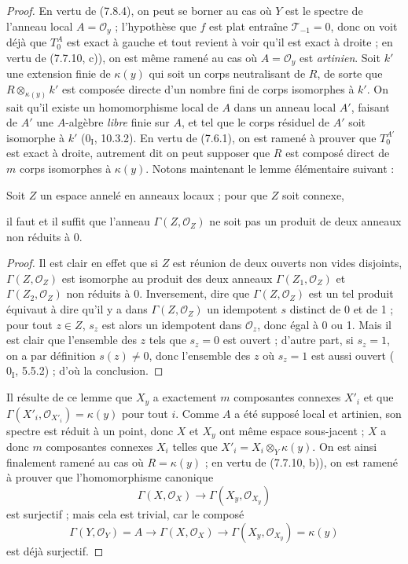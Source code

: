 \begin{proof}
En vertu de (7.8.4), on peut se borner au cas où $Y$ est le spectre de l'anneau
local $A=\mathscr O_y$ ; l'hypothèse que $f$ est plat entraîne
$\mathscr T_{-1}=0$, donc on voit déjà que $T_0^A$ est exact à gauche et tout
revient à voir qu'il est exact à droite ; en vertu de (7.7.10, c)), on est même
ramené au cas où $A=\mathscr O_y$ est \emph{artinien}. Soit $k'$ une extension
finie de $\kappa(y)$ qui soit un corps neutralisant de $R$, de sorte que
$R\otimes_{\kappa(y)}k'$ est composée directe d'un nombre fini de corps
isomorphes à $k'$. On sait qu'il existe un homomorphisme local de $A$ dans un
anneau local $A'$, faisant de $A'$ une $A$-algèbre \emph{libre} finie sur $A$,
et tel que le corps résiduel de $A'$ soit isomorphe à $k'$ ($0_{\mathrm I}$,
10.3.2). En vertu de (7.6.1), on est ramené à prouver que $T_0^{A'}$ est exact
à droite, autrement dit on peut supposer que $R$ est composé direct de $m$
corps isomorphes à $\kappa(y)$. Notons maintenant le lemme élémentaire
suivant :

\begin{lemma}[7.8.6.1]
Soit $Z$ un espace annelé en anneaux locaux ; pour que $Z$ soit connexe,

il faut et il suffit que l'anneau $\Gamma(Z,\mathscr O_Z)$ ne soit pas un produit
de deux anneaux non réduits à 0.
\end{lemma}

\begin{proof}
Il est clair en effet que si $Z$ est réunion de deux ouverts non vides disjoints,
$\Gamma(Z,\mathscr O_Z)$ est isomorphe au produit des deux anneaux
$\Gamma(Z_1,\mathscr O_Z)$ et $\Gamma(Z_2,\mathscr O_Z)$ non réduits à 0.
Inversement, dire que $\Gamma(Z,\mathscr O_Z)$ est un tel produit équivaut à
dire qu'il y a dans $\Gamma(Z,\mathscr O_Z)$ un idempotent $s$ distinct de 0 et
de 1 ; pour tout $z\in Z$, $s_z$ est alors un idempotent dans $\mathscr O_z$,
donc égal à 0 ou 1. Mais il est clair que l'ensemble des $z$ tels que $s_z=0$
est ouvert ; d'autre part, si $s_z=1$, on a par définition $s(z)\ne0$, donc
l'ensemble des $z$ où $s_z=1$ est aussi ouvert ($0_{\mathrm I}$, 5.5.2) ; d'où
la conclusion.
\end{proof}

Il résulte de ce lemme que $X_y$ a exactement $m$ composantes connexes $X'_i$
et que $\Gamma(X'_i,\mathscr O_{X'_i})=\kappa(y)$ pour tout $i$. Comme $A$ a été
supposé local et artinien, son spectre est réduit à un point, donc $X$ et $X_y$
ont même espace sous-jacent ; $X$ a donc $m$ composantes connexes $X_i$ telles
que $X'_i=X_i\otimes_Y\kappa(y)$. On est ainsi finalement ramené au cas où
$R=\kappa(y)$ ; en vertu de (7.7.10, b)), on est ramené à prouver que
l'homomorphisme canonique
\[
  \Gamma(X,\mathscr O_X)
  \longrightarrow
  \Gamma(X_y,\mathscr O_{X_y})
\]
est surjectif ; mais cela est trivial, car le composé
\[
  \Gamma(Y,\mathscr O_Y)=A
  \longrightarrow
  \Gamma(X,\mathscr O_X)
  \longrightarrow
  \Gamma(X_y,\mathscr O_{X_y})=\kappa(y)
\]
est déjà surjectif.
\end{proof}

